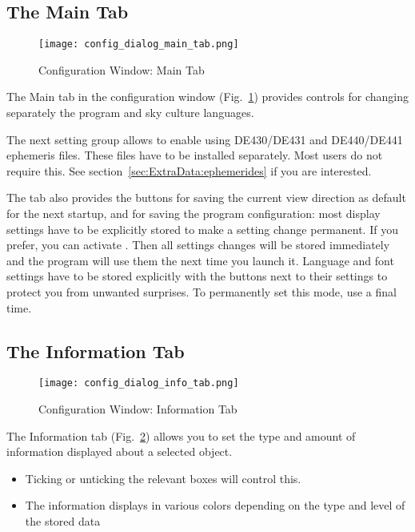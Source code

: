 \subsection{The Main Tab}
\label{sec:gui:configuration:main}


\begin{figure}[htbp]
\centering\texttt{[image: config\_dialog\_main\_tab.png]}
\caption{Configuration Window: Main Tab}
\label{fig:gui:configuration:main}
\end{figure}

The Main tab in the configuration window (Fig.~\ref{fig:gui:configuration:main}) provides controls for
changing separately the program and sky culture languages.

The next setting group allows to enable using DE430/DE431 and DE440/DE441 ephemeris files. 
These files have to be installed separately. Most users do not require this. 
See section~\ref{sec:ExtraData:ephemerides} if you are interested.

The tab also provides the buttons for saving the current view direction as default 
for the next startup, and for saving the program configuration: 
most display settings have to be explicitly stored to make a setting change permanent.
If you prefer, you can activate . 
Then all settings changes will be stored immediately and the program will use them the next time you launch it. 
Language and font settings have to be stored explicitly with the buttons next to their settings to protect you from unwanted surprises. 
To permanently set this mode, use  a final time.

\subsection{The Information Tab}
\label{sec:gui:configuration:info}

\begin{figure}[htbp]
\centering\texttt{[image: config\_dialog\_info\_tab.png]}
\caption{Configuration Window: Information Tab}
\label{fig:gui:configuration:info}
\end{figure}

The Information tab (Fig.~\ref{fig:gui:configuration:info}) allows you to set the type and amount of information
displayed about a selected object.
\begin{itemize}
\item Ticking or unticking the relevant boxes will control this.
\item The information displays in various colors depending on the type and
level of the stored data
\end{itemize}

